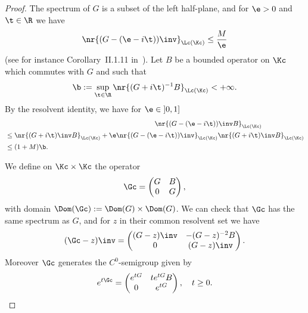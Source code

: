 \begin{proof}
The spectrum of $G$ is a subset of the left half-plane, and for $\e > 0$ and $\t \in \R$ we have
\begin{equation}\label{estim-res-G}
\nr{(G-(\e-i\t))\inv}_{\Lc(\Kc)} \leq \frac M \e
\end{equation}
(see for instance Corollary~II.1.11 in~\cite{engel}). Let $B$ be a bounded operator on $\Kc$ which commutes with $G$ and such that
\[
\b := \sup_{\t \in \R} \nr{(G+i\t)^{-1} B}_{\Lc(\Kc)} < +\infty.
\]
By the resolvent identity, we have for $\e \in\mathopen{]}0,1]$
\begin{multline}\label{estim-resG-B}
\lefteqn{\nr{(G-(\e-i\t))\inv B}_{\Lc(\Kc)}}\\
\begin{aligned}
& \leq \nr{(G+i\t)\inv B}_{\Lc(\Kc)} + \e \nr{(G-(\e-i\t))\inv}_{\Lc(\Kc)}\nr{(G+i\t)\inv B}_{\Lc(\Kc)}\\
& \leq (1+M)\b.
\end{aligned}
\end{multline}

We define on $\Kc \times \Kc$ the operator
\[
\Gc =
\begin{pmatrix}
G & B \\
0 & G
\end{pmatrix},
\]
with domain $\Dom(\Gc) := \Dom(G) \times \Dom(G)$. We can check that $\Gc$ has the same spectrum as $G$, and for $z$ in their common resolvent set we have
\[
(\Gc - z)\inv =
\begin{pmatrix}
(G-z)\inv & -(G-z)^{-2} B \\
0 & (G-z)\inv
\end{pmatrix}.
\]
Moreover $\Gc$ generates the $C^0$-semigroup given by
\[
e^{t\Gc} =
\begin{pmatrix}
e^{tG} & t e^{tG} B \\
0 & e^{tG}
\end{pmatrix}, \quad t \geq 0.
\]


\end{proof}
